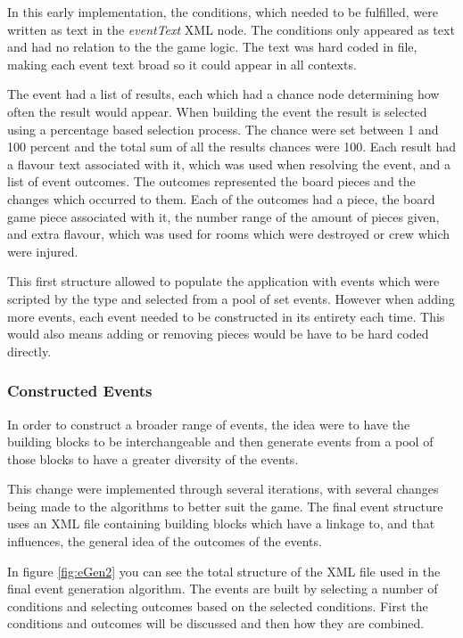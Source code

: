 In this early implementation, the conditions, which needed to be fulfilled, were written as text in the \textit{eventText} XML node. The conditions only appeared as text and had no relation to the the game logic. The text was hard coded in file, making each event text broad so it could appear in all contexts.

The event had a list of results, each which had a chance node determining how often the result would appear. When building the event the result is selected using a percentage based selection process. The chance were set between 1 and 100 percent and the total sum of all the results chances were 100. 
Each result had a flavour text associated with it, which was used when resolving the event, and a list of event outcomes. 
The outcomes represented the board pieces and the changes which occurred to them. Each of the outcomes had a piece, the board game piece associated with it, the number range of the amount of pieces given, and extra flavour, which was used for rooms which were destroyed or crew which were injured.

This first structure allowed to populate the application with events which were scripted by the type and selected from a pool of set events. 
However when adding more events, each event needed to be constructed in its entirety each time. This would also means adding or removing pieces would be have to be hard coded directly. 

\subsubsection{Constructed Events}
\label{sec:eventGeneration}
In order to construct a broader range of events, the idea were to have the building blocks to be interchangeable and then generate events from a pool of those blocks to have a greater diversity of the events.

This change were implemented through several iterations, with several changes being made to the algorithms to better suit the game. The final event structure uses an XML file containing building blocks which have a linkage to, and that influences, the general idea of the outcomes of the events.

In figure \ref{fig:eGen2} you can see the total structure of the XML file used in the final event generation algorithm. 
The events are built by selecting a number of conditions and selecting outcomes based on the selected conditions. 
First the conditions and outcomes will be discussed and then how they are combined.

